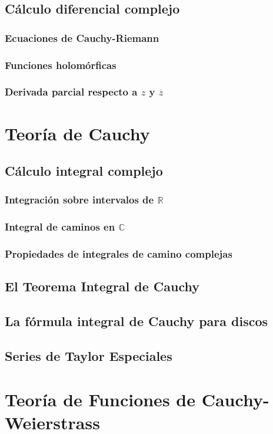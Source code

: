 \documentclass{report}
\begin{document}
\chapter{Cálculo diferencial complejo}
\section{Ecuaciones de Cauchy-Riemann}
\section{Funciones holomórficas}
\section{Derivada parcial respecto a $z$ y $\overline{z}$}

\part{Teoría de Cauchy}
\chapter{Cálculo integral complejo}
\section{Integración sobre intervalos de $\mathbb{R}$}
\section{Integral de caminos en $\mathbb{C}$}
\section{Propiedades de integrales de camino complejas}
\chapter{El Teorema Integral de Cauchy}
\chapter{La fórmula integral de Cauchy para discos}
\chapter{Series de Taylor Especiales}

\part{Teoría de Funciones de Cauchy-Weierstrass}
\end{document}
